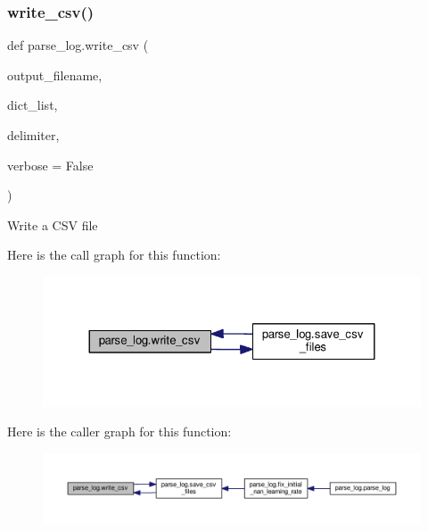 \subsubsection{\texorpdfstring{write\+\_\+csv()}{write\_csv()}}
{\footnotesize\ttfamily def parse\+\_\+log.\+write\+\_\+csv (\begin{DoxyParamCaption}\item[{}]{output\+\_\+filename,  }\item[{}]{dict\+\_\+list,  }\item[{}]{delimiter,  }\item[{}]{verbose = {\ttfamily False} }\end{DoxyParamCaption})}

\begin{DoxyVerb}Write a CSV file
\end{DoxyVerb}
 Here is the call graph for this function\+:
\nopagebreak
\begin{figure}[H]
\begin{center}
\leavevmode
\includegraphics[width=324pt]{namespaceparse__log_a485ed97888fccc67e8067cb51ce03db4_cgraph}
\end{center}
\end{figure}
Here is the caller graph for this function\+:
\nopagebreak
\begin{figure}[H]
\begin{center}
\leavevmode
\includegraphics[width=350pt]{namespaceparse__log_a485ed97888fccc67e8067cb51ce03db4_icgraph}
\end{center}
\end{figure}
